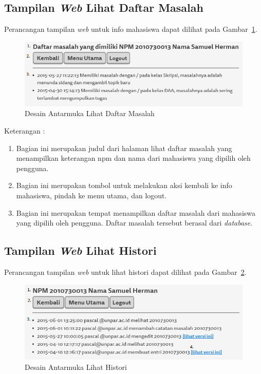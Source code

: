 \subsection{Tampilan {\it Web} Lihat Daftar Masalah}
Perancangan tampilan {\it web} untuk info mahasiswa dapat dilihat pada Gambar~\ref{fig:lihatmasalah}.
\begin{figure}[ht]
\centering
\includegraphics[scale=0.9]{Gambar/lihatmasalah.png}
\caption[Desain Antarmuka Lihat Daftar Masalah]{Desain Antarmuka Lihat Daftar Masalah}
\label{fig:lihatmasalah}
\end{figure}

Keterangan :
\begin{enumerate}[(1)]
\item
Bagian ini merupakan judul dari halaman lihat daftar masalah yang menampilkan keterangan npm dan nama dari mahasiswa yang dipilih oleh pengguna.
\item
Bagian ini merupakan tombol untuk melakukan aksi kembali ke info mahasiswa, pindah ke menu utama, dan logout.
\item
Bagian ini merupakan tempat menampilkan daftar masalah dari mahasiswa yang dipilih oleh pengguna. Daftar masalah tersebut berasal dari {\it database}.
\end{enumerate}

\subsection{Tampilan {\it Web} Lihat Histori}
Perancangan tampilan {\it web} untuk lihat histori dapat dilihat pada Gambar~\ref{fig:lihathistori}.
\begin{figure}[ht]
\centering
\includegraphics[scale=0.9]{Gambar/lihathistori.png}
\caption[Desain Antarmuka Lihat Histori]{Desain Antarmuka Lihat Histori}
\label{fig:lihathistori}
\end{figure}

